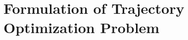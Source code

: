 \documentclass[main.tex]{subfiles}
\begin{document}
\section{Formulation of Trajectory Optimization Problem}
\label{sec:formulation}
\begin{comment}
\subsection{State Equation}
To mathematically describe the evolution of the system over discrete time intervals, we define a state vector $x_k$ at each time step $k$. This state contains all the information necessary to describe the system's configuration and motion. The state variable is defined as follows :
\begin{itemize}
    \item $\mathbf{p}_k$: the position of the system’s center of mass in the global frame.
    \item $\mathbf{q}_k$: the orientation of the system, typically represented as a unit quaternion to avoid singularities associated with Euler angles.
    \item $\mathbf{v}_k$: the linear velocity of the system's center of mass.
    \item $\mathbf{L}_k$: the system's angular momentum, which plays a critical role in dynamic balance and motion planning.
    \item $t_k$: the timestamp indicating the start of the $k$^\text{th} contact phase, marking discrete events in the locomotion sequence.
    \item $\{ \mathbf{p}_{l,k} \}_{l=1}^{n_e}$: the positions of the $n_e$ end-effectors (e.g., feet or hands), relative to the global coordinate frame.
    \item $\{ \mathbf{q}_{l,k} \}_{l=1}^{n_e}$: the orientations of these end-effectors, also represented using quaternions.
\end{itemize}
where $p_k$ is the position, $v_k$ is the linear velocity, $q_k$ is the quaternion representing orientation, and $\omega_k$ is the angular velocity of the system at time step $k$. 
The control input vector $u_k$ can be defined in different forms depending on the control strategy. Since in \ref{sec:method} we are using a stiffness-based control strategy, the control input is defined as:
\begin{equation}
    u_k = \left\{ \tau_k, \{ \mathbf{v}_{l,k} \}_{l=1}^{n_e}, \{ \boldsymbol{\omega}_{l,k} \}_{l=1}^{n_e}, \{ \boldsymbol{\lambda}_{l,k} \}_{l=1}^{n_e}, \{ \mathbf{r}_{l,k} \}_{l=1}^{n_e}, \{ \boldsymbol{\eta}_{l,k} \}_{l=1}^{n_e} \right\}
\end{equation}
\begin{itemize}
    \item $\boldsymbol{\lambda}_{l,k}$: Lagrange multipliers enforcing constraints (e.g., contact or joint limits).
    \item $\mathbf{r}_{l,k}$: reaction forces at the contact points.
\end{itemize}


\end{comment}
\end{document}
